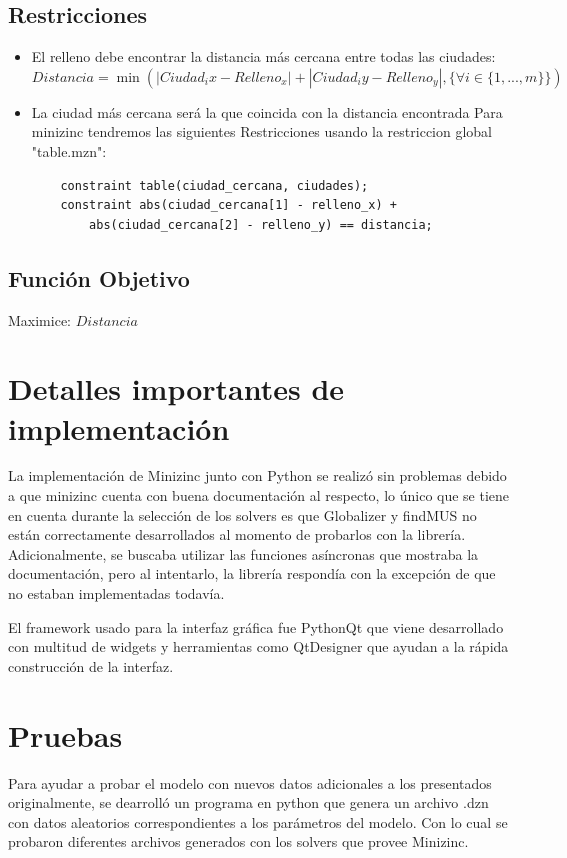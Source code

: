 \documentclass{article}
\begin{document}
\subsection{Restricciones}
\begin{itemize}
    \item El relleno debe encontrar la distancia más cercana entre todas las ciudades:
    $Distancia = \min( |Ciudad_ix - Relleno_x| + |Ciudad_iy - Relleno_y|, \{ \forall i \in \{1,...,m\} \})$
    \item La ciudad más cercana será la que coincida con la distancia encontrada
    Para minizinc tendremos las siguientes Restricciones usando la restriccion global "table.mzn":
    \begin{lstlisting}
    constraint table(ciudad_cercana, ciudades);
    constraint abs(ciudad_cercana[1] - relleno_x) +
        abs(ciudad_cercana[2] - relleno_y) == distancia;
    \end{lstlisting}
\end{itemize}

\subsection{Función Objetivo}
Maximice: $Distancia$

\section{Detalles importantes de implementación}
La implementación de Minizinc junto con Python se realizó sin problemas debido a que minizinc cuenta con buena documentación al respecto,
lo único que se tiene en cuenta durante la selección de los solvers es que Globalizer y findMUS no están correctamente desarrollados al momento de probarlos con la librería.
Adicionalmente, se buscaba utilizar las funciones asíncronas que mostraba la documentación, pero al intentarlo, la librería respondía con la excepción de que no estaban implementadas todavía.

El framework usado para la interfaz gráfica fue PythonQt que viene desarrollado con multitud de widgets y herramientas como QtDesigner que ayudan a la rápida construcción
de la interfaz.

\section{Pruebas}
Para ayudar a probar el modelo con nuevos datos adicionales a los presentados originalmente, se dearrolló un programa en python que genera un archivo .dzn
con datos aleatorios correspondientes a los parámetros del modelo. Con lo cual se probaron diferentes archivos generados con los solvers que provee Minizinc.
\end{document}
